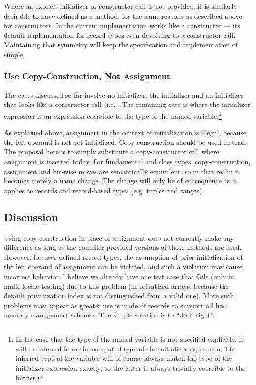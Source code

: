 Where an explicit initializer or constructor call is not provided, it is similarly desirable to have
 defined as a method, for the same reasons as described above for
constructors.  In the current implementation  works like a constructor
--- its default implementation for record types even devolving to a constructor call.
Maintaining that symmetry will keep the specification and implementation of
 simple.

\subsubsection{Use Copy-Construction, Not Assignment}

The cases discussed so far involve no initializer, the  initializer and an
initializer that looks like a constructor call (i.e. .  The remaining
case is where the initializer expression is an expression coercible to the type of the
named variable.\footnote{In the case that the type of the named variable is not specified
  explicitly, it will be inferred from the computed type of the initializer expression.
  The inferred type of the variable will of course always match the type of the
  initializer expression exactly, so the latter is always trivially coercible to the
  former.}

As explained above, assignment in the context of initialization is illegal, because the
left operand is not yet initialized.  Copy-construction should be used instead.  The
proposal here is to simply substitute a copy-constructor call where assignment is inserted
today.  For fundamental and class types, copy-construction, assignment and bit-wise moves are
semantically equivalent, so in that realm it becomes merely a name change.  The change
will only be of consequence as it applies to records and record-based types (e.g. tuples
and ranges).

\subsection{Discussion}

Using copy-construction in place of assignment does not currently make any difference as
long as the compiler-provided versions of those methods are used.  However, for
user-defined record types, the assumption of prior initialization of the left operand of
assignment can be violated, and such a violation may cause incorrect behavior.  I believe
we already have one test case that fails (only in multi-locale testing) due to this
problem (in privatized arrays, because the default privatization index is not distinguished
from a valid one).  More such problems may appear as greater use is made of records to
support ad hoc memory management schemes.  The simple solution is to ``do it
right''.

